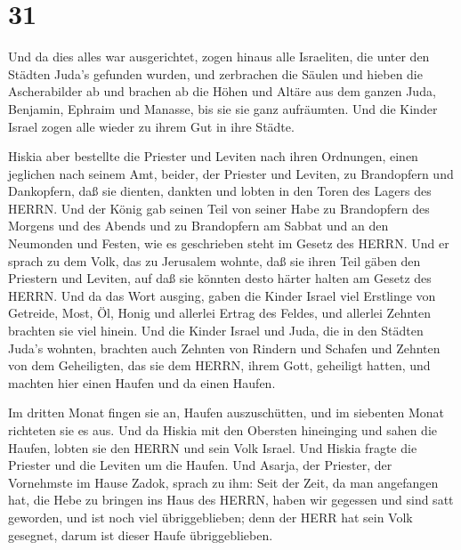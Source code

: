 \hypertarget{section-30}{%
\section{31}\label{section-30}}

 Und da dies alles war ausgerichtet, zogen hinaus alle
Israeliten, die unter den Städten Juda's gefunden wurden, und zerbrachen
die Säulen und hieben die Ascherabilder ab und brachen ab die Höhen und
Altäre aus dem ganzen Juda, Benjamin, Ephraim und Manasse, bis sie sie
ganz aufräumten. Und die Kinder Israel zogen alle wieder zu ihrem Gut in
ihre Städte.

 Hiskia aber bestellte die Priester und Leviten nach ihren
Ordnungen, einen jeglichen nach seinem Amt, beider, der Priester und
Leviten, zu Brandopfern und Dankopfern, daß sie dienten, dankten und
lobten in den Toren des Lagers des HERRN.  Und der König gab
seinen Teil von seiner Habe zu Brandopfern des Morgens und des Abends
und zu Brandopfern am Sabbat und an den Neumonden und Festen, wie es
geschrieben steht im Gesetz des HERRN.  Und er sprach zu dem
Volk, das zu Jerusalem wohnte, daß sie ihren Teil gäben den Priestern
und Leviten, auf daß sie könnten desto härter halten am Gesetz des
HERRN.  Und da das Wort ausging, gaben die Kinder Israel
viel Erstlinge von Getreide, Most, Öl, Honig und allerlei Ertrag des
Feldes, und allerlei Zehnten brachten sie viel hinein.  Und
die Kinder Israel und Juda, die in den Städten Juda's wohnten, brachten
auch Zehnten von Rindern und Schafen und Zehnten von dem Geheiligten,
das sie dem HERRN, ihrem Gott, geheiligt hatten, und machten hier einen
Haufen und da einen Haufen.

 Im dritten Monat fingen sie an, Haufen auszuschütten, und
im siebenten Monat richteten sie es aus.  Und da Hiskia mit
den Obersten hineinging und sahen die Haufen, lobten sie den HERRN und
sein Volk Israel.  Und Hiskia fragte die Priester und die
Leviten um die Haufen.  Und Asarja, der Priester, der
Vornehmste im Hause Zadok, sprach zu ihm: Seit der Zeit, da man
angefangen hat, die Hebe zu bringen ins Haus des HERRN, haben wir
gegessen und sind satt geworden, und ist noch viel übriggeblieben; denn
der HERR hat sein Volk gesegnet, darum ist dieser Haufe übriggeblieben.

